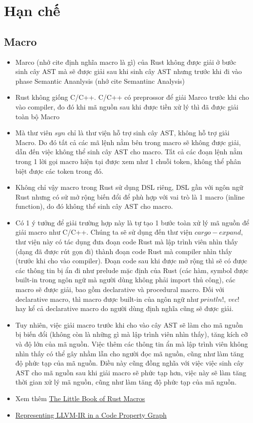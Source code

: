 \section{Hạn chế}

\subsection{Macro}

\begin{itemize}
    \item Marco (nhớ cite định nghĩa macro là gì) của Rust không được giải ở bước sinh cây AST mà sẽ được giải sau khi sinh cây AST nhưng trước khi đi vào phase Semantic Ananlysis (nhớ cite Semantinc Analysis)
    \item Rust không giống C/C++. C/C++ có preprossor để giải Marco trước khi cho vào compiler, đo đó khi mã nguồn sau khi được tiền xử lý thì đã được giải toàn bộ Macro
    \item Mà thư viên $syn$ chỉ là thư viện hỗ trợ sinh cây AST, không hỗ trợ giải Macro. Do đó tất cả các mã lệnh nằm bên trong macro sẽ không được giải, dẫn đến việc không thể sinh cây AST cho macro. Tất cả các đoạn lệnh nằm trong 1 lời gọi macro hiện tại được xem như 1 chuỗi token, không thể phân biệt được các token trong đó.
    \item Không chỉ vậy macro trong Rust sử dụng DSL riêng, DSL gần với ngôn ngữ Rust nhưng có sử mở rộng biến đổi để phù hợp với vai trò là 1 macro (inline function), do đó không thể sinh cây AST cho macro.
    \item Có 1 ý tưởng để giải trường hợp này là tự tạo 1 bước toàn xử lý mã nguồn để giải macro như C/C++. Chúng ta sẽ sử dụng đến thư viện $cargo-expand$, thư viện này có tác dụng đưa đoạn code Rust mà lập trình viên nhìn thấy (dạng đã được rút gọn đi) thành đoạn code Rust mà compiler nhìn thấy (trước khi cho vào compiler). Đoạn code sau khi được mở rộng thì sẽ có được các thông tin bị ẩn đi như prelude mặc định của Rust (các hàm, symbol được built-in trong ngôn ngữ mà người dùng không phải import thủ công), các macro sẽ được giải, bao gồm declarative và procedural macro. Đối với declarative macro, thì macro được built-in của ngôn ngữ như $println!$, $vec!$ hay kể cả declarative macro do người dùng định nghĩa cũng sẽ được giải.
    \item Tuy nhiên, việc giải macro trước khi cho vào cây AST sẽ làm cho mã nguồn bị biến đổi (không còn là những gì mà lập trình viên nhìn thấy), tăng kích cỡ và độ lớn của mã nguồn. Việc thêm các thông tin ẩn mà lập trình viên không nhìn thấy có thể gây nhầm lẫn cho người đọc mã nguồn, cũng như làm tăng độ phức tạp của mã nguồn. Điều này cũng đồng nghĩa với việc việc sinh cây AST cho mã nguồn sau khi giải macro sẽ phức tạp hơn, việc này sẽ làm tăng thời gian xử lý mã nguồn, cũng như làm tăng độ phức tạp của mã nguồn.
    \item Xem thêm \href{https://veykril.github.io/tlborm/syntax-extensions/source-analysis.html}{The Little Book of Rust Macros}
    \item \href{https://arxiv.org/pdf/2211.05627}{Representing LLVM-IR in a Code Property Graph}
\end{itemize}

